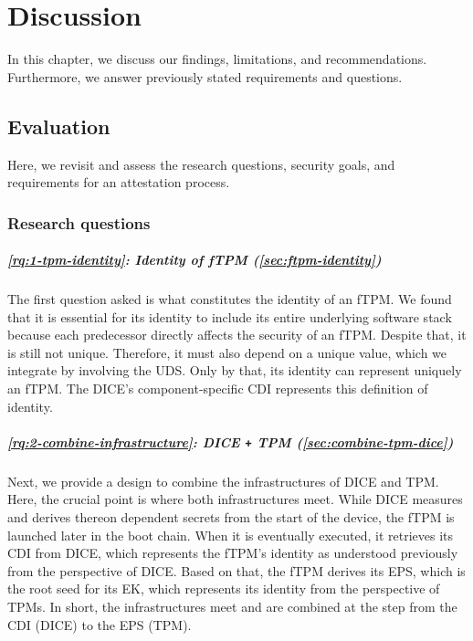 
\chapter{Discussion}\label{chapter:discussion}

In this chapter, we discuss our findings, limitations, and recommendations.
Furthermore, we answer previously stated requirements and questions.

\section{Evaluation}

Here, we revisit and assess the research questions, security goals, and requirements for an attestation process.

\subsection{Research questions}


\paragraph{\ref{rq:1-tpm-identity}: Identity of \ac{fTPM} (\autoref{sec:ftpm-identity})}\label{par:identity}
The first question asked is what constitutes the identity of an fTPM\@.
We found that it is essential for its identity to include its entire underlying software stack because each predecessor directly affects the security of an \ac{fTPM}.
Despite that, it is still not unique.
Therefore, it must also depend on a unique value, which we integrate by involving the \ac{UDS}.
Only by that, its identity can represent uniquely an \ac{fTPM}.
The \ac{DICE}'s component-specific \ac{CDI} represents this definition of identity.

\paragraph{\ref{rq:2-combine-infrastructure}: \acs{DICE} \texttt{+} \acs{TPM} (\autoref{sec:combine-tpm-dice})}
Next, we provide a design to combine the infrastructures of \ac{DICE} and \ac{TPM}.
Here, the crucial point is where both infrastructures meet.
While \ac{DICE} measures and derives thereon dependent secrets from the start of the device, the \ac{fTPM} is launched later in the boot chain.
When it is eventually executed, it retrieves its \ac{CDI} from \ac{DICE}, which represents the fTPM's identity as understood previously from the perspective of \ac{DICE}.
Based on that, the \ac{fTPM} derives its \ac{EPS}, which is the root seed for its \ac{EK}, which represents its identity from the perspective of \acp{TPM}.
In short, the infrastructures meet and are combined at the step from the \ac{CDI} (DICE) to the \ac{EPS} (TPM).

